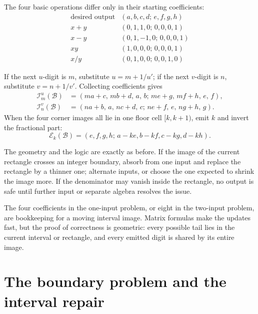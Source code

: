 The four basic operations differ only in their starting coefficients:
\[
\begin{array}{c|c}
\text{desired output} & (a,b,c,d;\,e,f,g,h)\\ \hline
x+y &(0,1,1,0;\,0,0,0,1)\\
x-y &(0,1,-1,0;\,0,0,0,1)\\
xy  &(1,0,0,0;\,0,0,0,1)\\
x/y &(0,1,0,0;\,0,0,1,0)
\end{array}
\]

If the next $u$-digit is $m$, substitute $u=m+1/u'$; if the next $v$-digit is
$n$, substitute $v=n+1/v'$.  Collecting coefficients gives
\begin{align}
\mathcal I^u_m(\mathcal B)
 &=(ma+c,\,mb+d,\,a,\,b;\,me+g,\,mf+h,\,e,\,f),
                                                        \label{eq:binary-absorb-u}\\
\mathcal I^v_n(\mathcal B)
 &=(na+b,\,a,\,nc+d,\,c;\,ne+f,\,e,\,ng+h,\,g).
                                                        \label{eq:binary-absorb-v}
\end{align}
When the four corner images all lie in one floor cell $[k,k+1)$, emit $k$ and
invert the fractional part:
\begin{equation}
\mathcal E_k(\mathcal B)
=(e,f,g,h;\,a-ke,b-kf,c-kg,d-kh).                  \label{eq:binary-emit}
\end{equation}

The geometry and the logic are exactly as before.  If the image of the current
rectangle crosses an integer boundary, absorb from one input and replace the
rectangle by a thinner one; alternate inputs, or choose the one expected to
shrink the image more.  If the denominator may vanish inside the rectangle,
no output is safe until further input or separate algebra resolves the issue.

\begin{bigidea}
The four coefficients in the one-input problem, or eight in the two-input
problem, are bookkeeping for a moving interval image.  Matrix formulas make
the updates fast, but the proof of correctness is geometric: every possible
tail lies in the current interval or rectangle, and every emitted digit is
shared by its entire image.
\end{bigidea}

\section{The boundary problem and the interval repair}

